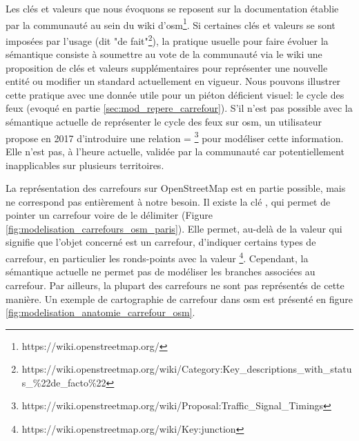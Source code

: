 \newpar{}


Les clés et valeurs que nous évoquons se reposent sur la documentation établie par la communauté au sein du wiki d'\gls{osm}\footnote{https://wiki.openstreetmap.org/}. Si certaines clés et valeurs se sont imposées par l'usage (dit "de fait"\footnote{https://wiki.openstreetmap.org/wiki/Category:Key\_descriptions\_with\_status\_\%22de\_facto\%22}), la pratique usuelle pour faire évoluer la sémantique consiste à soumettre au vote de la communauté via le wiki une proposition de clés et valeurs supplémentaires pour représenter une nouvelle entité ou modifier un standard actuellement en vigueur. Nous pouvons illustrer cette pratique avec une donnée utile pour un piéton déficient visuel: le cycle des feux (evoqué en partie \ref{sec:mod_repere_carrefour}). S'il n'est pas possible avec la sémantique actuelle de représenter le cycle des feux sur \gls{osm}, un utilisateur propose en 2017 d'introduire une relation = \footnote{https://wiki.openstreetmap.org/wiki/Proposal:Traffic\_Signal\_Timings} pour modéliser cette information. Elle n'est pas, à l'heure actuelle, validée par la communauté car potentiellement inapplicables sur plusieurs territoires.

\newpar{}


La représentation des carrefours sur OpenStreetMap est en partie possible, mais ne correspond pas entièrement à notre besoin. Il existe la clé , qui permet de pointer un carrefour voire de le délimiter (Figure \ref{fig:modelisation_carrefours_osm_paris}). Elle permet, au-delà de la valeur  qui signifie que l'objet concerné est un carrefour, d'indiquer certains types de carrefour, en particulier les ronds-points avec la valeur \footnote{https://wiki.openstreetmap.org/wiki/Key:junction}. Cependant, la sémantique actuelle ne permet pas de modéliser les branches associées au carrefour. Par ailleurs, la plupart des carrefours ne sont pas représentés de cette manière. Un exemple de cartographie de carrefour dans \gls{osm} est présenté en figure \ref{fig:modelisation_anatomie_carrefour_osm}.

